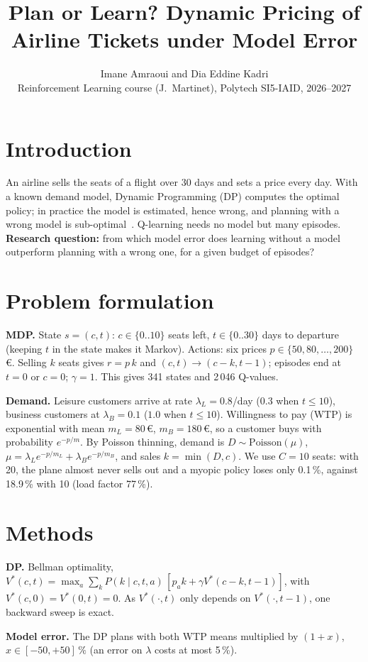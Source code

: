 \documentclass[10pt,a4paper]{article}
\title{\vspace{-1.6cm}\Large\textbf{Plan or Learn? Dynamic Pricing of Airline Tickets under Model Error}}
\author{Imane Amraoui and Dia Eddine Kadri\\
\small Reinforcement Learning course (J.~Martinet), Polytech SI5-IAID, 2026--2027}
\date{\vspace{-1.1cm}}
\begin{document}
\maketitle

\section{Introduction}
An airline sells the seats of a flight over 30 days and sets a price every day.
With a known demand model, Dynamic Programming (DP) computes the optimal policy; in practice the model is estimated, hence wrong, and planning with a wrong model is sub-optimal~\cite[\S 8.3]{sutton}.
Q-learning needs no model but many episodes.
\textbf{Research question:} from which model error does learning without a model outperform planning with a wrong one, for a given budget of episodes?

\section{Problem formulation}
\textbf{MDP.} State $s=(c,t)$: $c\in\{0..10\}$ seats left, $t\in\{0..30\}$ days to departure (keeping $t$ in the state makes it Markov).
Actions: six prices $p\in\{50,80,\dots,200\}$\,\euro.
Selling $k$ seats gives $r=p\,k$ and $(c,t)\to(c-k,t-1)$; episodes end at $t=0$ or $c=0$; $\gamma=1$.
This gives 341 states and 2\,046 Q-values.

\textbf{Demand.} Leisure customers arrive at rate $\lambda_L=0.8$/day ($0.3$ when $t\le10$), business customers at $\lambda_B=0.1$ ($1.0$ when $t\le10$).
Willingness to pay (WTP) is exponential with mean $m_L=80$\,\euro, $m_B=180$\,\euro, so a customer buys with probability $e^{-p/m}$.
By Poisson thinning, demand is $D\sim\mathrm{Poisson}(\mu)$, $\mu=\lambda_L e^{-p/m_L}+\lambda_B e^{-p/m_B}$, and sales $k=\min(D,c)$.
We use $C=10$ seats: with 20, the plane almost never sells out and a myopic policy loses only 0.1\,\%, against 18.9\,\% with 10 (load factor 77\,\%).

\section{Methods}
\textbf{DP.} Bellman optimality, $V^*(c,t)=\max_a \sum_{k} P(k\mid c,t,a)\,[p_a k+\gamma V^*(c-k,t-1)]$, with $V^*(c,0)=V^*(0,t)=0$.
As $V^*(\cdot,t)$ only depends on $V^*(\cdot,t-1)$, one backward sweep is exact.

\textbf{Model error.} The DP plans with both WTP means multiplied by $(1+x)$, $x\in[-50,+50]\,\%$ (an error on $\lambda$ costs at most 5\,\%).
\end{document}
